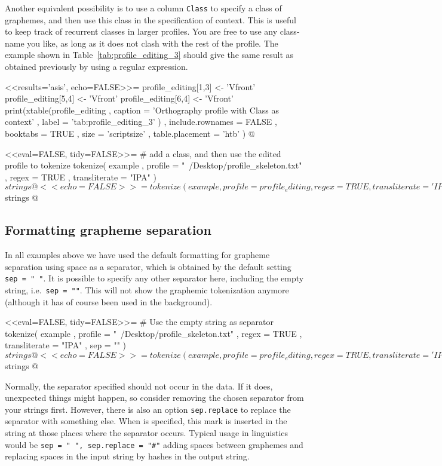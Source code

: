 Another equivalent possibility is to use a column \texttt{Class} to specify a
class of graphemes, and then use this class in the specification of context.
This is useful to keep track of recurrent classes in larger profiles. You are
free to use any class-name you like, as long as it does not clash with the rest
of the profile. The example shown in Table~\ref{tab:profile_editing_3} should 
give the same result as obtained previously by using a regular expression.

<<results='asis', echo=FALSE>>=
profile_editing[1,3] <- 'Vfront'
profile_editing[5,4] <- 'Vfront'
profile_editing[6,4] <- 'Vfront'
print(xtable(profile_editing
        , caption = 'Orthography profile with Class as context'
        , label = 'tab:profile_editing_3'
        )
  , include.rownames = FALSE
  , booktabs = TRUE
  , size = 'scriptsize'
  , table.placement = 'htb'
  )
@

<<eval=FALSE, tidy=FALSE>>=
# add a class, and then use the edited profile to tokenize
tokenize( example
         , profile = "~/Desktop/profile_skeleton.txt"
         , regex = TRUE
         , transliterate = "IPA"
        )$strings
@

<<echo=FALSE>>=
tokenize(example
  , profile = profile_editing
  , regex = TRUE
  , transliterate = 'IPA'
  )$strings
@

\subsection*{Formatting grapheme separation}
\label{formattingseparation}

In all examples above we have used the default formatting for grapheme
separation using space as a separator, which is obtained by the default setting
\texttt{sep~=~"~"}. It is possible to specify any other separator here,
including the empty string, i.e.\ \texttt{sep = ""}. This will not show the
graphemic tokenization anymore (although it has of course been used in the
background).

<<eval=FALSE, tidy=FALSE>>=
# Use the empty string as separator
tokenize( example
         , profile = "~/Desktop/profile_skeleton.txt"
         , regex = TRUE
         , transliterate = "IPA"
         , sep = ""
        )$strings
@

<<echo=FALSE>>=
tokenize(example
  , profile = profile_editing
  , regex = TRUE
  , transliterate = 'IPA'
  , sep = ''
  )$strings
@

Normally, the separator specified should not occur in the data. If it does,
unexpected things might happen, so consider removing the chosen separator from
your strings first. However, there is also an option \texttt{sep.replace} to
replace the separator with something else. When  is specified,
this mark is inserted in the string at those places where the separator occurs.
Typical usage in linguistics would be \texttt{sep = " ", sep.replace = "\#"} adding
spaces between graphemes and replacing spaces in the input string by hashes in
the output string.

